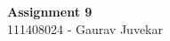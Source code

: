 \documentclass[main.tex]{subfiles}
\begin{document}
\begin{titlepage}

\begin{center}
  \LARGE{\bf{Assignment 9\\}}
  \horrule{0.4pt}
  111408024 - Gaurav Juvekar \\
\end{center}
\horrule{0.4pt}
\end{titlepage}
\end{document}

